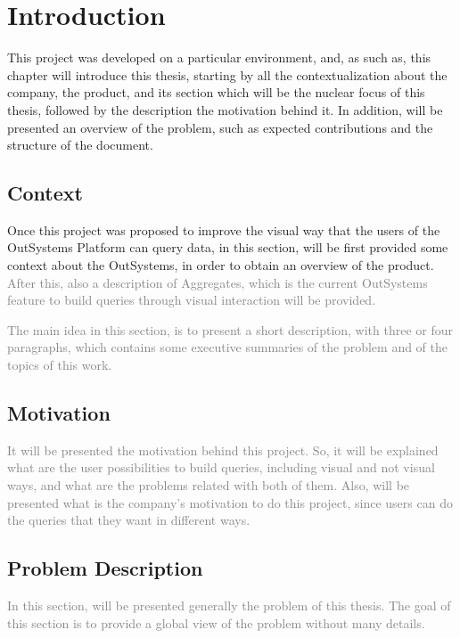 \newcommand{\novathesis}{\emph{novathesis}}
\newcommand{\novathesisclass}{\texttt{novathesis.cls}}


\chapter{Introduction}
\label{cha:introduction}
This project was developed on a particular environment, and, as such as, this chapter will introduce this thesis, starting by all the contextualization about the company, the product, and its section which will be the nuclear focus of this thesis, followed by the description the motivation behind it. In addition, will be presented an overview of the problem, such as expected contributions and the structure of the document. 

\section{Context} 
\label{sec:context}
Once this project was proposed to improve the visual way that the users of the OutSystems Platform can query data, in this section, will be first provided some context about the OutSystems, in order to obtain an overview of the product. \textcolor{gray}{After this, also a description of Aggregates, which is the current OutSystems feature to build queries through visual interaction will be provided.}

\textcolor{gray}{The main idea in this section, is to present a short description, with three or four paragraphs, which contains some executive summaries of the problem and of the topics of this work.}

\section{Motivation}
\label{sec:motivation}
\textcolor{gray}{It will be presented the motivation behind this project. So, it will be explained what are the user possibilities to build queries, including visual and not visual ways, and what are the problems related with both of them. Also, will be presented what is the company's motivation to do this project, since users can do the queries that they want in different ways.}

\section{Problem Description}
\label{sec:problem_description}
\textcolor{gray}{In this section, will be presented generally the problem of this thesis. The goal of this section is to provide a global view of the problem without many details.}

